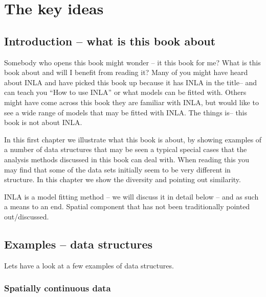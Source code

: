 
\chapter{The key ideas}


\section{Introduction -- what is this book about}
Somebody who opens this book might wonder -- it this book for me? What is this book about and will I benefit from reading it?
 Many of you might have heard about INLA and have picked this book up because it has INLA in the title-- and can teach you ``How to use INLA'' or what models can be fitted with. Others might have come across this book they are familiar with INLA, but would like to see a wide  range of models that may be fitted with INLA. The things is-- this book is not about INLA.
 
In this first chapter we illustrate what this book  is about, by showing examples of a number of data structures that may be seen a typical special cases that the analysis methods discussed in this book can deal with. When reading this you may find that some of the data sets initially seem to be very different in structure. In this chapter we show the diversity and pointing out similarity.

INLA is a model fitting method -- we will discuss it in detail below -- and as such a means to an end. 
Spatial component that has not been traditionally pointed out/discussed.


\section{Examples -- data structures}

Lets have a look at a few examples of data structures.

\subsection{Spatially continuous data}

